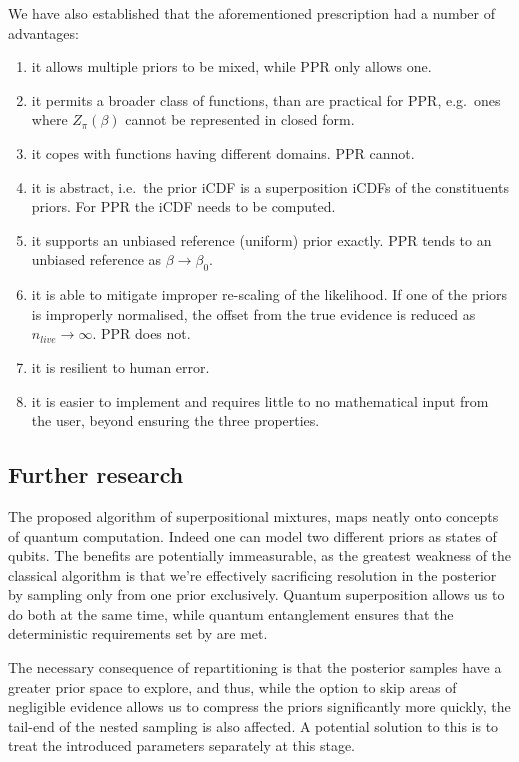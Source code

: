 \documentclass[usenatbib]{mnras}
\begin{document}
We have also established that the aforementioned prescription had a
number of advantages:
\begin{enumerate}
\item it allows multiple priors to be mixed, while PPR only allows
one.
\item it permits a broader class of functions, than are practical for
PPR, e.g.~ones where \(Z_{\pi}(\beta)\) cannot be represented in
closed form.
\item it copes with functions having different domains. PPR cannot.
\item it is abstract, i.e.~the prior iCDF is a superposition iCDFs of
the constituents priors. For PPR the iCDF needs to be computed.
\item it supports an unbiased reference (uniform) prior exactly. PPR
tends to an unbiased reference as \(\beta\rightarrow\beta_{0}\).
\item it is able to mitigate improper re-scaling of the likelihood. If
one of the priors is improperly normalised, the offset from the
true evidence is reduced as \(n_{live}\rightarrow\infty\). PPR
does not.
\item it is resilient to human error.
\item it is easier to implement and requires little to no mathematical
input from the user, beyond ensuring the three properties.
\end{enumerate}


\subsection{Further research}\label{sec:org8314ddf}
The proposed algorithm of superpositional mixtures, maps neatly
onto concepts of quantum computation. Indeed one can model two
different priors as states of qubits. The benefits are potentially
immeasurable, as the greatest weakness of the classical algorithm
is that we're effectively sacrificing resolution in the posterior
by sampling only from one prior exclusively. Quantum superposition
allows us to do both at the same time, while quantum entanglement
ensures that the deterministic requirements set by
\citeauthor{Skilling2006} are met.

The necessary consequence of repartitioning is that the posterior
samples have a greater prior space to explore, and thus, while the
option to skip areas of negligible evidence allows us to compress
the priors significantly more quickly, the tail-end of the nested
sampling is also affected. A potential solution to this is to treat
the introduced parameters separately at this stage.
\end{document}
